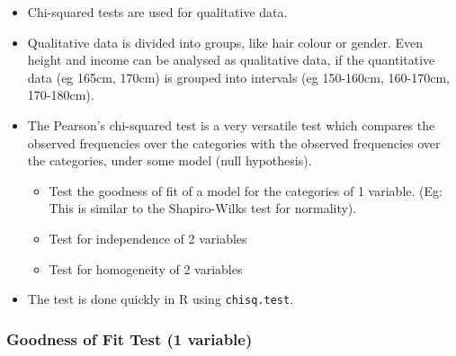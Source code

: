 \documentclass[]{article}
\begin{document}
\begin{itemize}
\item
  Chi-squared tests are used for qualitative data.
\item
  Qualitative data is divided into groups, like hair colour or gender. Even height and income can be analysed as qualitative data, if the quantitative data (eg 165cm, 170cm) is grouped into intervals (eg 150-160cm, 160-170cm, 170-180cm).
\item
  The Pearson's chi-squared test is a very versatile test which compares the observed frequencies over the categories with the observed frequencies over the categories, under some model (null hypothesis).

  \begin{itemize}
  \item
    Test the goodness of fit of a model for the categories of 1 variable. (Eg: This is similar to the Shapiro-Wilks test for normality).
  \item
    Test for independence of 2 variables
  \item
    Test for homogeneity of 2 variables
  \end{itemize}
\item
  The test is done quickly in R using \texttt{chisq.test}.
\end{itemize}

\hypertarget{goodness-of-fit-test-1-variable}{%
\subsubsection{Goodness of Fit Test (1 variable)}\label{goodness-of-fit-test-1-variable}}
\end{document}
